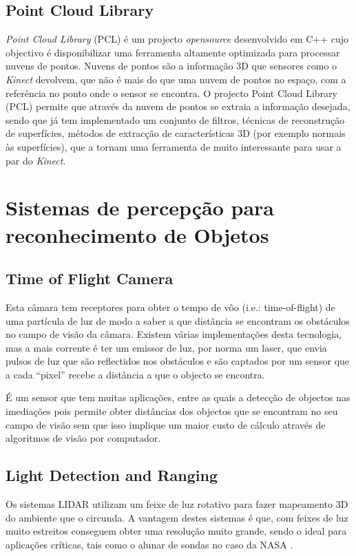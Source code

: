 \subsection[PCL]{Point Cloud Library}

\emph{Point Cloud Library} (PCL) é um projecto \emph{opensource} desenvolvido em C++ 
cujo objectivo é disponibilizar uma ferramenta altamente optimizada para 
processar nuvens de pontos. Nuvens de pontos são a informação 3D que sensores 
como o \emph{Kinect} devolvem, que não é mais do que uma nuvem de pontos no espaço,
com a referência no ponto onde o sensor se encontra.
O projecto Point Cloud Library (PCL) \cite{Rusu_ICRA2011_PCL} permite que
através da nuvem de pontos se extraia a informação desejada, sendo que
já tem implementado um conjunto de filtros, técnicas de reconstrução de
superfícies, métodos de extracção de características 3D (por exemplo
normais às superfícies), que a tornam uma ferramenta de muito interessante para usar
a par do \emph{Kinect}.

\section{Sistemas de percepção para reconhecimento de Objetos}

\subsection{Time of Flight Camera}
Esta câmara tem receptores para obter o tempo de vôo (i.e.: time-of-flight)
de uma partícula de luz de modo a saber a que distância se encontram os
obstáculos no campo de visão da câmara. Existem várias implementações desta
tecnologia, mas a mais corrente é ter um emissor de luz, por norma um laser,
que envia pulsos de luz que são reflectidos nos obstáculos e são captados por
um sensor que a cada “pixel” recebe a distância a que o objecto se encontra.

É um sensor que tem muitas aplicações, entre as quais a detecção de objectos nas imediações
pois permite obter distâncias dos objectos que se encontram no seu campo
de visão sem que isso implique um maior custo de cálculo através de algoritmos
de visão por computador. 

\subsection[LIDAR]{Light Detection and Ranging}

Os sistemas LIDAR utilizam um feixe de luz rotativo para fazer mapeamento 3D
do ambiente que o circunda. A vantagem destes sistemas é que, com feixes de
luz muito estreitos conseguem obter uma resolução muito grande, sendo o ideal
para aplicações críticas, tais como o alunar de sondas no caso da NASA \cite{Keim2010}.

